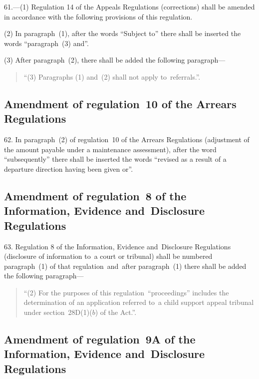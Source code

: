 \documentclass[12pt,a4paper]{article}
\begin{document}
\begin{sloppypar}
61.—(1) Regulation 14 of
the Appeals Regulations (corrections) shall be amended in accordance with the
following provisions of this regulation.
\end{sloppypar}

(2) In paragraph~(1), after the words “Subject to” there shall be inserted the
words “paragraph~(3) and”.

(3) After paragraph~(2), there shall be added the following paragraph—
\begin{quotation}
“(3) Paragraphs (1) and~(2) shall not apply to~referrals.”.
\end{quotation}

\subsection[62. Amendment of regulation~10 of the Arrears Regulations]{Amendment of regulation~10 of the Arrears Regulations}

62. In paragraph~(2) of
regulation~10 of the Arrears Regulations (adjustment of the amount payable under
a maintenance assessment), after the word “subsequently” there shall be inserted
the words “revised as a result of a departure direction having been given or”.

\subsection[63. Amendment of regulation~8 of the Information, Evidence and~Disclosure
Regulations]{Amendment of regulation~8 of the Information, Evidence and~Disclosure
Regulations}

63. Regulation 8 of the Information, Evidence and~Disclosure
Regulations (disclosure of information to~a court or tribunal) shall be numbered
paragraph~(1) of that regulation~and~after paragraph~(1) there shall be added
the following paragraph—
\begin{quotation}
“(2) For the purposes of this regulation~“proceedings” includes the
determination of an application referred to~a child support appeal tribunal
under section~28D(1)($b$) of the Act.”.
\end{quotation}

\subsection[64. Amendment of regulation~9A of the Information, Evidence and~Disclosure
Regulations]{Amendment of regulation~9A of the Information, Evidence and~Disclosure
Regulations}
\end{document}

